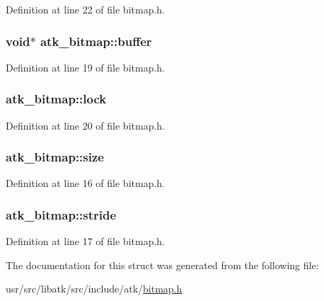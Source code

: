 Definition at line 22 of file bitmap.\+h.

\hypertarget{structatk__bitmap_a3bed7ee0d49e89b2a1dd250ee2e58ab6}{
\subsubsection[{buffer}]{\setlength{\rightskip}{0pt plus 5cm}void$\ast$ atk\+\_\+bitmap\+::buffer}}\label{structatk__bitmap_a3bed7ee0d49e89b2a1dd250ee2e58ab6}


Definition at line 19 of file bitmap.\+h.

\hypertarget{structatk__bitmap_a045e533dfb5e23a575443d389f3dba95}{
\subsubsection[{lock}]{ atk\+\_\+bitmap\+::lock}}\label{structatk__bitmap_a045e533dfb5e23a575443d389f3dba95}


Definition at line 20 of file bitmap.\+h.

\hypertarget{structatk__bitmap_afd44fc93403d7addaa5142944e3add03}{
\subsubsection[{size}]{ atk\+\_\+bitmap\+::size}}\label{structatk__bitmap_afd44fc93403d7addaa5142944e3add03}


Definition at line 16 of file bitmap.\+h.

\hypertarget{structatk__bitmap_a9716a316bc05bb6997a9da73ddb0ee3b}{
\subsubsection[{stride}]{ atk\+\_\+bitmap\+::stride}}\label{structatk__bitmap_a9716a316bc05bb6997a9da73ddb0ee3b}


Definition at line 17 of file bitmap.\+h.



The documentation for this struct was generated from the following file\+:\begin{DoxyCompactItemize}
\item 
usr/src/libatk/src/include/atk/\hyperlink{bitmap_8h}{bitmap.\+h}\end{DoxyCompactItemize}
